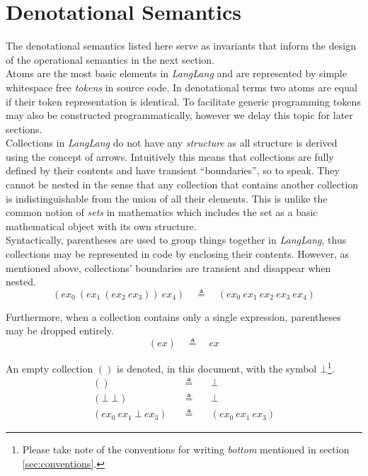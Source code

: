 \documentclass[a4paper,11pt]{article}
\begin{document}
\section{Denotational Semantics}

The denotational semantics listed here serve as invariants that inform the design of the operational semantics in the next section.\\

Atoms are the most basic elements in \textsl{LangLang} and are represented by simple whitespace free \emph{tokens} in source code.
In denotational terms two atoms are equal if their token representation is identical.
To facilitate generic programming tokens may also be constructed programmatically, however we delay this topic for later sections.\\

Collections in \textsl{LangLang} do not have any \emph{structure} as all structure is derived using the concept of arrows.
Intuitively this means that collections are fully defined by their contents and have transient ``boundaries'', so to speak.
They cannot be nested in the sense that any collection that contains another collection is indistinguishable from the union of all their elements.
This is unlike the common notion of \emph{sets} in mathematics which includes the set as a basic mathematical object with its own structure.\\

Syntactically, parentheses are used to group things together in \textsl{LangLang}, thus collections may be represented in code by enclosing their contents.
However, as mentioned above, collections' boundaries are transient and disappear when nested.
\[
(ex_0\ (ex_1\ (ex_2\ ex_3))\ ex_4) \quad\triangleq\quad (ex_0\ ex_1\ ex_2\ ex_3\ ex_4)
\]

Furthermore, when a collection contains only a single expression, parentheses may be dropped entirely.
\[
(ex) \quad\triangleq\quad ex
\]

An empty collection $()$ is denoted, in this document, with the symbol $\bot$\footnote{Please take note of the conventions for writing \emph{bottom} mentioned in section \ref{sec:conventions}.}.
\begin{eqnarray*}
() \quad&\triangleq&\quad \bot \\
(\bot\ \bot) \quad&\triangleq&\quad \bot \\
(ex_0\ ex_1\ \bot\ ex_3) \quad&\triangleq&\quad (ex_0\ ex_1\ ex_3)
\end{eqnarray*}
\end{document}
